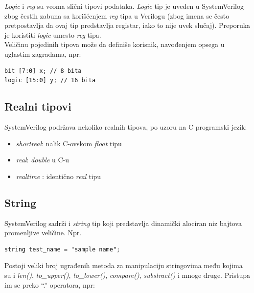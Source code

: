 \emph{Logic} i \emph{reg} su veoma slični tipovi podataka.
\emph{Logic} tip je uveden u SystemVerilog zbog čestih zabuna sa korišćenjem
\emph{reg} tipa u Verilogu (zbog imena se često pretpostavlja da ovaj tip
predstavlja registar, iako to nije uvek slučaj).
Preporuka je koristiti \emph{logic} umesto \emph{reg} tipa.\\

Veličinu pojedinih tipova može da definiše korisnik, navođenjem opsega u
uglastim zagradama, npr:

\begin{lstlisting}
bit [7:0] x; // 8 bita
logic [15:0] y; // 16 bita
\end{lstlisting}


\subsection{Realni tipovi}

SystemVerilog podržava nekoliko realnih tipova, po uzoru na C programski jezik:

\begin{itemize}
\item \emph{shortreal}: nalik C-ovskom \emph{float} tipu
\item \emph{real}: \emph{double} u C-u
\item \emph{realtime} : identično \emph{real} tipu
\end{itemize}


\subsection{String}

SystemVerilog sadrži i \emph{string} tip koji predstavlja dinamički alociran niz
bajtova promenljive veličine. Npr.

\begin{lstlisting}
string test_name = "sample name";
\end{lstlisting}

Postoji veliki broj ugrađenih metoda za manipulaciju stringovima među kojima
su i \emph{len()}, \emph{to\_upper()}, \emph{to\_lower()}, \emph{compare()},
\emph{substract()} i mnoge druge.
Pristupa im se preko ``.'' operatora, npr:

